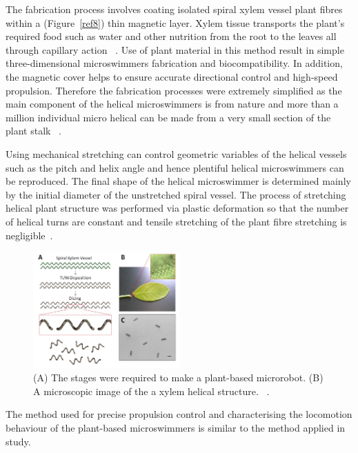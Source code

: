 \documentclass[a4paper,11pt]{article}
\begin{document}
\begin{sloppypar}
The fabrication process involves coating isolated spiral xylem vessel plant fibres within a (Figure~\ref{ref8})
thin magnetic layer. Xylem tissue transports the plant\rq{}s required food such as water and other 
nutrition from the root to the leaves all through capillary action ~\citep{mahoney2011velocity}.
Use of plant material in this method result in simple three-dimensional microswimmers fabrication 
and biocompatibility. In addition, the magnetic cover helps to ensure accurate directional control and 
high-speed propulsion. Therefore the fabrication processes were extremely simplified as the main 
component of the helical microswimmers is from nature and more than a million individual micro helical 
can be made from a very small section of the plant stalk ~\citep{mahoney2011velocity}. 


Using mechanical stretching can control geometric variables of the helical vessels such as the pitch and
 helix angle and hence plentiful helical microswimmers can be reproduced. The final shape of the 
helical microswimmer is determined mainly by the initial diameter of the unstretched spiral vessel. The
 process of stretching helical plant structure was performed via plastic deformation so that the number 
of helical turns are constant and tensile stretching of the plant fibre stretching is negligible~\citep{mahoney2011velocity}. 

\begin{figure}
  \begin{center}
    \includegraphics[width=0.5\textwidth]{plants2}
  \caption{(A) The stages were required to make a plant-based microrobot. (B) A microscopic image of the 
a xylem helical structure. ~\citep{gao2013bioinspired}.}
  \label{plants2}
\end{center}
\end{figure}

The method used for precise propulsion control and characterising the locomotion behaviour of the 
plant-based microswimmers is similar to the method applied in \citeauthor{gao2013bioinspired} study.


\end{sloppypar}
\end{document}
